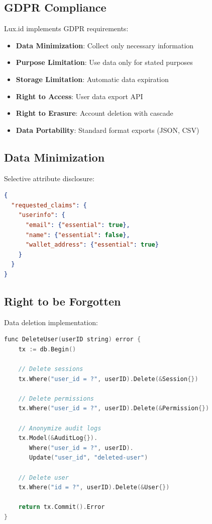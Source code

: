 \documentclass[11pt,a4paper]{article}
\begin{document}
\subsection{GDPR Compliance}

Lux.id implements GDPR requirements:

\begin{itemize}
    \item \textbf{Data Minimization}: Collect only necessary information
    \item \textbf{Purpose Limitation}: Use data only for stated purposes
    \item \textbf{Storage Limitation}: Automatic data expiration
    \item \textbf{Right to Access}: User data export API
    \item \textbf{Right to Erasure}: Account deletion with cascade
    \item \textbf{Data Portability}: Standard format exports (JSON, CSV)
\end{itemize}

\subsection{Data Minimization}

Selective attribute disclosure:

\begin{lstlisting}[language=json]
{
  "requested_claims": {
    "userinfo": {
      "email": {"essential": true},
      "name": {"essential": false},
      "wallet_address": {"essential": true}
    }
  }
}
\end{lstlisting}

\subsection{Right to be Forgotten}

Data deletion implementation:

\begin{lstlisting}[language=C]
func DeleteUser(userID string) error {
    tx := db.Begin()

    // Delete sessions
    tx.Where("user_id = ?", userID).Delete(&Session{})

    // Delete permissions
    tx.Where("user_id = ?", userID).Delete(&Permission{})

    // Anonymize audit logs
    tx.Model(&AuditLog{}).
       Where("user_id = ?", userID).
       Update("user_id", "deleted-user")

    // Delete user
    tx.Where("id = ?", userID).Delete(&User{})

    return tx.Commit().Error
}
\end{lstlisting}
\end{document}
